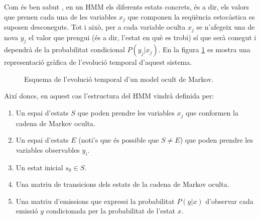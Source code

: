 \documentclass[
	a4paper,
	twoside,
	justified
]{tufte-book}
\begin{document}
Com és ben sabut \citep[p. 588-91,835]{russell09}, en un HMM els diferents estats concrets, és a dir, els valors  que prenen cada una de les variables $x_j$ que componen la seqüència estocàstica es suposen desconeguts. Tot i això, per a cada variable oculta $x_j$ se n'afegeix una de nova $y_j$ el valor que prengui (és a dir, l'estat en què es trobi) sí que serà conegut i dependrà de la probabilitat condicional $P(y_j|x_j)$. En la figura \ref{dia:hmm_evo} es mostra una representació gràfica de l'evolució temporal d'aquest sistema.            

\begin{figure}
\begin{center}
\end{center}
\caption{
	\label{dia:hmm_evo}
	Esquema de l'evolució temporal d'un model ocult de Markov.
}
\end{figure}

Així doncs, en aquest cas l'estructura del HMM vindrà definida per:

\begin{enumerate}[(1)]
	\item Un espai d'estats $S$ que poden prendre les variables $x_j$ que conformen la cadena de Markov oculta.
	\item Un espai d'estats $E$ (noti's que és possible que $S \neq E$) que poden prendre les variables observables $y_i$. 
	\item Un estat inicial $s_0 \in S$.  
	\item Una matriu de transicions dels estats de la cadena de Markov oculta.
	\item Una matriu d'emissions que expressi la probabilitat $P(y|x)$ d'observar cada emissió $y$ condicionada per la probabilitat de l'estat $x$.   
\end{enumerate}
\end{document}
